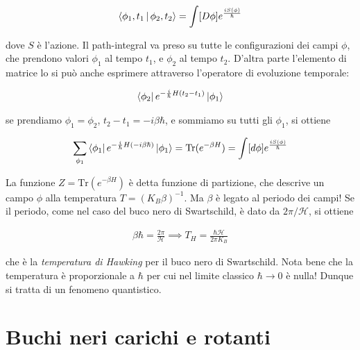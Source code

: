 \documentclass{report}
\begin{document}
\begin{align}
    \Braket{\phi_1, t_1 | \phi_2, t_2} = \int [D\phi]e^{\frac{i S(\phi)}{\hbar}}
\end{align}

dove \(S\) è l'azione. Il path-integral va preso su tutte le configurazioni dei campi \(\phi\), che prendono valori \(\phi_1\) al tempo \(t_1\), e \(\phi_2\) al tempo \(t_2\). D'altra parte l'elemento di matrice lo si può anche esprimere attraverso l'operatore di evoluzione temporale: 

\begin{align}
    \bra{\phi_2}e^{-\frac{i}{\hbar}H(t_2-t_1)}\ket{\phi_1}
\end{align}

se prendiamo  \(\phi_1 = \phi_2\), \(t_2 - t_1 = -i\beta\hbar\), e sommiamo su tutti gli \(\phi_1\), si ottiene 

\begin{align}
    \sum_{\phi_1}\bra{\phi_1}e^{-\frac{i}{\hbar}H(-i\beta \hbar)}\ket{\phi_1} = \text{Tr}(e^{-\beta H}) = \int [d\phi]e^{\frac{iS(\phi)}{\hbar}}
\end{align}

La funzione \(Z = \text{Tr}(e^{-\beta H})\) è detta funzione di partizione, che descrive un campo \(\phi\) alla temperatura \(T = (K_B \beta)^{-1}\). Ma \(\beta\) è legato al periodo dei campi! Se il periodo, come nel caso del buco nero di Swartschild, è dato da \(2\pi/\mathcal{H}\), si ottiene 

\begin{align}
    \beta \hbar = \frac{2\pi}{\mathcal{H}} \implies T_H = \frac{\hbar \mathcal{H}}{2\pi K_B}
\end{align}

che è la \emph{temperatura di Hawking} per il buco nero di Swartschild. Nota bene che la temperatura è proporzionale a \(\hbar\) per cui nel limite classico \(\hbar \rightarrow 0\) è nulla! Dunque si tratta di un fenomeno quantistico. 

\section{Buchi neri carichi e rotanti}

\end{document}
